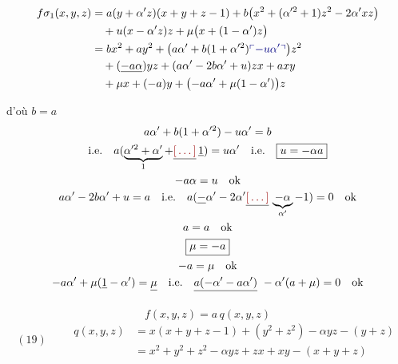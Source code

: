 \documentclass[11pt,a4paper]{article}
\begin{document}
\begin{align*}
f\sigma_1(x, y, z) &= a(y + \alpha' z)(x + y + z - 1) + b\bigl(x^2 + (\alpha'^2 + 1)z^2 - 2\alpha' xz\bigr) \\
&\quad + u(x - \alpha' z)z + \mu\bigl(x + (1 - \alpha')z\bigr) \\
&= bx^2 + ay^2 + \bigl(a\alpha' + b(1 + \alpha'^2) \add{- u\alpha'}\bigr)z^2 \\
&\quad + (\uncertain{-a\alpha})yz + (a\alpha' - 2b\alpha' + u)zx + axy \\
&\quad + \mu x + (-a)y + \bigl(-a\alpha' + \mu(1 - \alpha')\bigr)z
\end{align*}

d'où $\boxed{b = a}$
\begin{gather*}
a\alpha' + b(1 + \alpha'^2) - u\alpha' = b \\
\text{i.e.} \quad a(\underbrace{\alpha'^2 + \alpha'}_{1} + \struck{\ill{}}\,\uncertain{1}) = u\alpha' \quad \text{i.e.} \quad \boxed{u = -\alpha a} \\
-a\alpha = u \quad \text{ok} \\
a\alpha' - 2b\alpha' + u = a \quad \text{i.e.} \quad a(\uncertain{-}\alpha' - 2\alpha' \struck{\ill{}}\,\underbrace{-\alpha}_{\alpha'} - 1) = 0 \quad \text{ok} \\
a = a \quad \text{ok} \\
\boxed{\mu = -a} \\
-a = \mu \quad \text{ok} \\
-a\alpha' + \mu(\struck{1} - \alpha') = \struck{\mu} \quad \text{i.e.} \quad \struck{a(-\alpha' - a\alpha')}\ -\alpha'(a + \mu) = 0 \quad \text{ok}
\end{gather*}

\[ f(x, y, z) = a\, q(x, y, z) \]
\[ (19) \qquad \boxed{\begin{aligned} q(x, y, z) &= x(x + y + z - 1) + (y^2 + z^2) - \alpha yz - (y + z) \\ &= x^2 + y^2 + z^2 - \alpha yz + zx + xy - (x + y + z) \end{aligned}} \]
\end{document}
